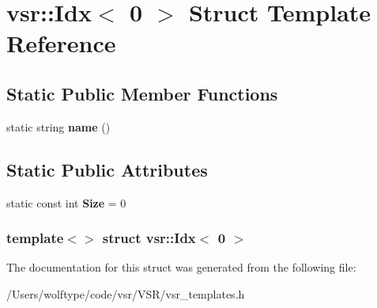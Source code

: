 \hypertarget{structvsr_1_1_idx_3_010_01_4}{\section{vsr\-:\-:Idx$<$ 0 $>$ Struct Template Reference}
\label{structvsr_1_1_idx_3_010_01_4}
}
\subsection*{Static Public Member Functions}
\begin{DoxyCompactItemize}
\item 
\hypertarget{structvsr_1_1_idx_3_010_01_4_a85f5fcda214e3e111c58f037c3fa7aca}{static string {\bfseries name} ()}\label{structvsr_1_1_idx_3_010_01_4_a85f5fcda214e3e111c58f037c3fa7aca}

\end{DoxyCompactItemize}
\subsection*{Static Public Attributes}
\begin{DoxyCompactItemize}
\item 
\hypertarget{structvsr_1_1_idx_3_010_01_4_ac418ddca0045dfb47e3857b4529e7a61}{static const int {\bfseries Size} = 0}\label{structvsr_1_1_idx_3_010_01_4_ac418ddca0045dfb47e3857b4529e7a61}

\end{DoxyCompactItemize}
\subsubsection*{template$<$$>$ struct vsr\-::\-Idx$<$ 0 $>$}



The documentation for this struct was generated from the following file\-:\begin{DoxyCompactItemize}
\item 
/\-Users/wolftype/code/vsr/\-V\-S\-R/vsr\-\_\-templates.\-h\end{DoxyCompactItemize}
